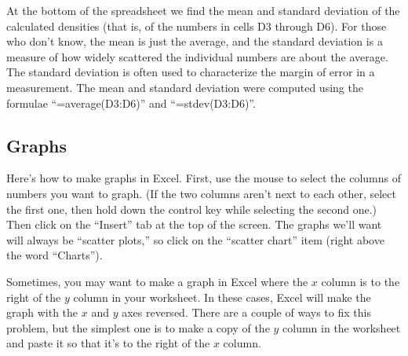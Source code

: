 At the bottom of the spreadsheet we find the mean and standard
deviation of the calculated densities (that is, of the numbers
in cells D3 through D6). For those who don't know, the mean
is just the average, and the 
standard deviation is a measure of how widely scattered the
individual numbers are about the average. The standard deviation
is often used to characterize the margin of error in a measurement.
 The mean and standard deviation were computed
using the formulae ``=average(D3:D6)'' and ``=stdev(D3:D6)''.


{\par\centering {} \par}


\subsection{Graphs}

Here's how to make graphs in Excel.  First, use the mouse
to select the columns of numbers you want to graph.  (If the two
columns aren't next to each other, select the first one, then hold
down the control key while selecting the second one.)
Then click on the ``Insert'' tab at the top of the screen. The
graphs we'll want will always be ``scatter plots,'' 
so click on the ``scatter chart'' item (right above the word ``Charts'').

Sometimes, you may want to make a graph in Excel where the $x$ column
is to the right of the $y$ column in your worksheet.  In these cases,
Excel will make the graph with the $x$ and $y$ axes reversed.  There
are a couple of ways to fix this problem, but the simplest one is to make
a copy of the $y$ column in the worksheet and paste it so that it's
to the right of the $x$ column. 

